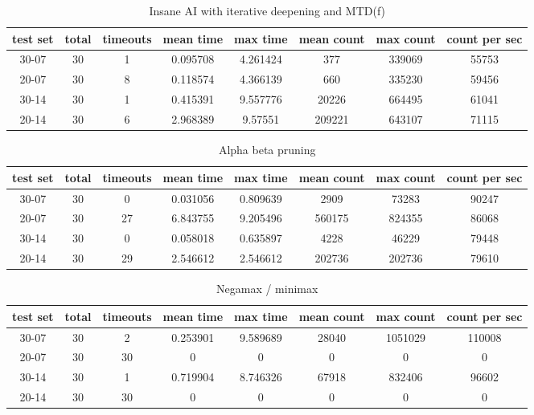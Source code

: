 \documentclass[a4paper]{article}
\begin{document}
\begin{table}[h]
	\centering
	\begin{adjustbox}{center}
	\begin{tabular}{|c|c|c|c|c|c|c|c|}\hline
	\textbf{test set} & \textbf{total} & \textbf{timeouts} & \textbf{mean time} & \textbf{max time} & \textbf{mean count} & \textbf{max count} & \textbf{count per sec} \\\hline
	30-07 & 30 & 1 & 0.095708 & 4.261424 & 377 & 339069 & 55753 \\\hline
	20-07 & 30 & 8 & 0.118574 & 4.366139 & 660 & 335230 & 59456 \\\hline
	30-14 & 30 & 1 & 0.415391 & 9.557776 & 20226 & 664495 & 61041 \\\hline
	20-14 & 30 & 6 & 2.968389 & 9.57551 & 209221 & 643107 & 71115 \\\hline
	\end{tabular}
	\end{adjustbox}
	\caption{Insane AI with iterative deepening and MTD(f)}
	\label{tab: }
\end{table}

\begin{table}[h]
	\centering
	\begin{adjustbox}{center}
	\begin{tabular}{|c|c|c|c|c|c|c|c|}\hline
	\textbf{test set} & \textbf{total} & \textbf{timeouts} & \textbf{mean time} & \textbf{max time} & \textbf{mean count} & \textbf{max count} & \textbf{count per sec} \\\hline
	30-07 & 30 & 0 & 0.031056 & 0.809639 & 2909 & 73283 & 90247 \\\hline
	20-07 & 30 & 27 & 6.843755 & 9.205496 & 560175 & 824355 & 86068 \\\hline
	30-14 & 30 & 0 & 0.058018 & 0.635897 & 4228 & 46229 & 79448 \\\hline
	20-14 & 30 & 29 & 2.546612 & 2.546612 & 202736 & 202736 & 79610 \\\hline
	\end{tabular}
	\end{adjustbox}
	\caption{Alpha beta pruning}
	\label{tab: }
\end{table}

\begin{table}[h]
	\centering
	\begin{adjustbox}{center}
	\begin{tabular}{|c|c|c|c|c|c|c|c|}\hline
	\textbf{test set} & \textbf{total} & \textbf{timeouts} & \textbf{mean time} & \textbf{max time} & \textbf{mean count} & \textbf{max count} & \textbf{count per sec} \\\hline
	30-07 & 30 & 2 & 0.253901 & 9.589689 & 28040 & 1051029 & 110008 \\\hline
	20-07 & 30 & 30 & 0 & 0 & 0 & 0 & 0 \\\hline
	30-14 & 30 & 1 & 0.719904 & 8.746326 & 67918 & 832406 & 96602 \\\hline
	20-14 & 30 & 30 & 0 & 0 & 0 & 0 & 0 \\\hline
	\end{tabular}
	\end{adjustbox}
	\caption{Negamax / minimax}
	\label{tab: }
\end{table}
\end{document}
